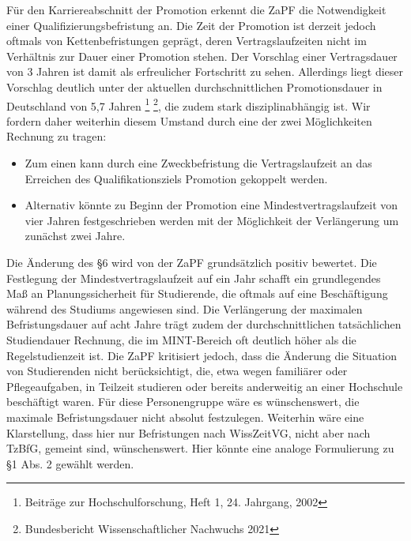 \documentclass[DIV=calc]{scrartcl}
\begin{document}
Für den Karriereabschnitt der Promotion erkennt die ZaPF die Notwendigkeit einer Qualifizierungsbefristung an. Die Zeit der Promotion ist derzeit jedoch oftmals von Kettenbefristungen geprägt, deren Vertragslaufzeiten nicht im Verhältnis zur Dauer einer Promotion stehen. Der Vorschlag einer Vertragsdauer von 3 Jahren ist damit als erfreulicher Fortschritt zu sehen. Allerdings liegt dieser Vorschlag deutlich unter der aktuellen durchschnittlichen Promotionsdauer in Deutschland von 5,7 Jahren \footnote{Beiträge zur Hochschulforschung, Heft 1, 24. Jahrgang, 2002}
\footnote{Bundesbericht Wissenschaftlicher Nachwuchs 2021}, die zudem stark disziplinabhängig ist. 
Wir fordern daher weiterhin 
diesem Umstand durch eine der zwei Möglichkeiten Rechnung zu tragen:
\begin{itemize}
    \item Zum einen kann durch eine Zweckbefristung die Vertragslaufzeit an das Erreichen des Qualifikationsziels Promotion gekoppelt werden.
    \item Alternativ könnte zu Beginn der Promotion eine Mindestvertragslaufzeit von vier Jahren festgeschrieben werden mit der Möglichkeit der Verlängerung um zunächst zwei Jahre.
\end{itemize}

Die Änderung des \S 6 wird von der ZaPF grundsätzlich positiv bewertet. Die Festlegung der Mindestvertragslaufzeit auf ein Jahr schafft ein grundlegendes Maß an Planungssicherheit für Studierende, die oftmals auf eine Beschäftigung während des Studiums angewiesen sind. Die Verlängerung der maximalen Befristungsdauer auf acht Jahre trägt zudem der durchschnittlichen tatsächlichen Studiendauer Rechnung, die im MINT-Bereich oft deutlich höher als die Regelstudienzeit ist. Die ZaPF kritisiert jedoch, dass die Änderung die Situation von Studierenden nicht berücksichtigt, die, etwa wegen familiärer oder Pflegeaufgaben, in Teilzeit studieren 
oder bereits anderweitig an einer Hochschule beschäftigt waren.
Für diese Personengruppe wäre es wünschenswert, die maximale Befristungsdauer nicht absolut festzulegen.
Weiterhin wäre eine Klarstellung, dass hier nur Befristungen nach WissZeitVG, nicht aber nach TzBfG, gemeint sind, wünschenswert. Hier könnte eine analoge Formulierung zu \S 1 Abs. 2 gewählt werden.
\end{document}

